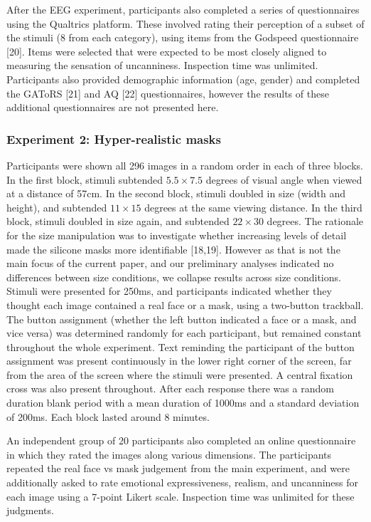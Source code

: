 \documentclass[
]{article}
\begin{document}
After the EEG experiment, participants also completed a series of questionnaires using the Qualtrics platform. These involved rating their perception of a subset of the stimuli (8 from each category), using items from the Godspeed questionnaire {[}20{]}. Items were selected that were expected to be most closely aligned to measuring the sensation of uncanniness. Inspection time was unlimited. Participants also provided demographic information (age, gender) and completed the GAToRS {[}21{]} and AQ {[}22{]} questionnaires, however the results of these additional questionnaires are not presented here.

\subsubsection{Experiment 2: Hyper-realistic masks}\label{experiment-2-hyper-realistic-masks}

Participants were shown all 296 images in a random order in each of three blocks. In the first block, stimuli subtended \(5.5\times7.5\) degrees of visual angle when viewed at a distance of 57cm. In the second block, stimuli doubled in size (width and height), and subtended \(11\times15\) degrees at the same viewing distance. In the third block, stimuli doubled in size again, and subtended \(22\times30\) degrees. The rationale for the size manipulation was to investigate whether increasing levels of detail made the silicone masks more identifiable {[}18,19{]}. However as that is not the main focus of the current paper, and our preliminary analyses indicated no differences between size conditions, we collapse results across size conditions. Stimuli were presented for 250ms, and participants indicated whether they thought each image contained a real face or a mask, using a two-button trackball. The button assignment (whether the left button indicated a face or a mask, and vice versa) was determined randomly for each participant, but remained constant throughout the whole experiment. Text reminding the participant of the button assignment was present continuously in the lower right corner of the screen, far from the area of the screen where the stimuli were presented. A central fixation cross was also present throughout. After each response there was a random duration blank period with a mean duration of 1000ms and a standard deviation of 200ms. Each block lasted around 8 minutes.

An independent group of 20 participants also completed an online questionnaire in which they rated the images along various dimensions. The participants repeated the real face vs mask judgement from the main experiment, and were additionally asked to rate emotional expressiveness, realism, and uncanniness for each image using a 7-point Likert scale. Inspection time was unlimited for these judgments.
\end{document}
